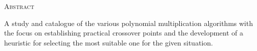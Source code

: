 \begin{center}
  \textsc{Abstract}
\end{center}
%
\noindent
%
A study and catalogue of the various polynomial multiplication algorithms with the focus on establishing practical crossover points and the development of a heuristic for selecting the most suitable one for the given situation.